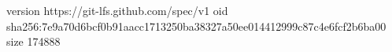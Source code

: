 version https://git-lfs.github.com/spec/v1
oid sha256:7e9a70d6bcf0b91aacc1713250ba38327a50ee014412999c87c4e6fcf2b6ba00
size 174888
